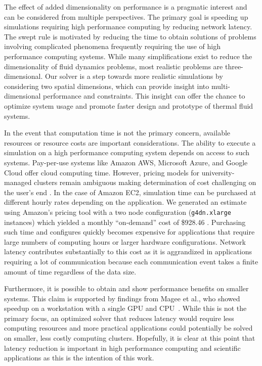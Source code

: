 \documentclass[mca,article,submit,moreauthors,pdftex]{Definitions/mdpi}
\begin{document}
The effect of added dimensionality on performance is a pragmatic interest and can be considered from multiple perspectives. The primary goal is speeding up simulations requiring high performance computing by reducing network latency. The swept rule is motivated by reducing the time to obtain solutions of problems involving complicated phenomena frequently requiring the use of high performance computing systems. While many simplifications exist to reduce the dimensionality of fluid dynamics problems, most realistic problems are three-dimensional. Our solver is a step towards more realistic simulations by considering two spatial dimensions, which can provide insight into multi-dimensional performance and constraints. This insight can offer the chance to optimize system usage and promote faster design and prototype of thermal fluid systems.

In the event that computation time is not the primary concern, available resources or resource costs are important considerations. The ability to execute a simulation on a high performance computing system depends on access to such systems. 
Pay-per-use systems like Amazon AWS, Microsoft Azure, and Google Cloud offer cloud computing time. However, pricing models for university-managed clusters remain ambiguous making determination of cost challenging on the user's end \cite{Mesnard2019}. 
In the case of Amazon EC2, simulation time can be purchased at different hourly rates depending on the application. We generated an estimate using Amazon's pricing tool with a two node configuration (\texttt{g4dn.xlarge} instances) which yielded a monthly ``on-demand'' cost of \$928.46 \cite{AmazonServices}. 
Purchasing such time and configures quickly becomes expensive for applications that require large numbers of computing hours or larger hardware configurations. Network latency contributes substantially to this cost as it is aggrandized in applications requiring a lot of communication because each communication event takes a finite amount of time regardless of the data size. 

Furthermore, it is possible to obtain and show performance benefits on smaller systems. This claim is supported by findings from Magee et al., who showed speedup on a workstation with a single GPU and CPU~\cite{magee_accelerating_2018}. 
While this is not the primary focus, an optimized solver that reduces latency would require less computing resources and more practical applications could potentially be solved on smaller, less costly computing clusters. 
Hopefully, it is clear at this point that latency reduction is important in high performance computing and scientific applications as this is the intention of this work.
\end{document}
